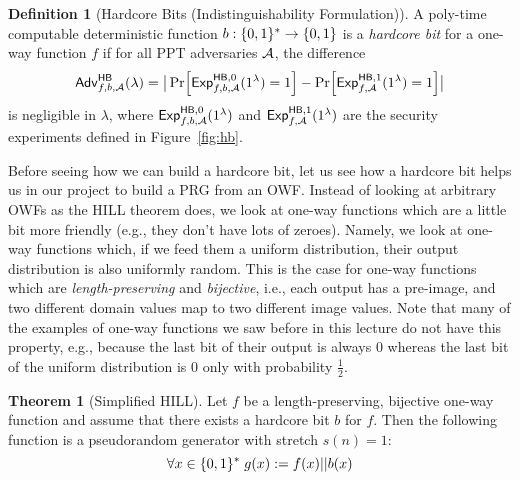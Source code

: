 \documentclass[a4paper,table,dvipsnames]{article}
\theoremstyle{definition}
\newtheorem{definition}{Definition}[section]
\newtheorem*{theorem}{Theorem}
\begin{document}
\begin{definition}[Hardcore Bits (Indistinguishability Formulation)]\label{def:hcb-ind}
A poly-time computable deterministic function $b:\{0,1\}^*\rightarrow\{0,1\}$ is a \emph{hardcore bit} for a one-way function $f$ if
for all PPT adversaries $\mathcal{A}$, the difference
\[ \mathsf{Adv}^{\mathsf{HB}}_{f,b,\adv}(\lambda)=\big|\prob{{\mathsf{Exp}}_{f,b,\adv}^{\mathsf{HB},0}(1^\lambda) = 1} 
   - \prob{{\mathsf{Exp}}_{f,\adv}^{\mathsf{HB},1}(1^\lambda) = 1}\big| \]
is negligible in $\lambda$, where ${\mathsf{Exp}}_{f,b,\mathcal{A}}^{\mathsf{HB},0}(1^\lambda)$ and ${\mathsf{Exp}}_{f,\mathcal{A}}^{\mathsf{HB},1}(1^\lambda)$ are the security experiments defined in Figure~\ref{fig:hb}.
\end{definition}

Before seeing how we can build a hardcore bit, let us see how a hardcore bit helps us in our project to build a PRG from an OWF.
Instead of looking at arbitrary OWFs as the HILL theorem does, we look at one-way functions which are a little bit more friendly
(e.g., they don't have lots of zeroes). Namely, we look at one-way functions which, if we feed them a uniform distribution, their
output distribution is also uniformly random. This is the case for one-way functions which are \emph{length-preserving} and
\emph{bijective}, i.e., each output has a pre-image, and two different domain values map to two different image values.
Note that many of the examples of one-way functions we saw before in this lecture do not have this property, e.g., because the last bit of their output is always $0$ whereas the last bit of the uniform distribution is $0$ only with probability $\tfrac{1}{2}$.
\begin{theorem}[Simplified HILL]\label{thm:weakHill}
Let $f$ be a length-preserving, bijective one-way function and assume that there exists a hardcore bit $b$ for $f$. Then the following function is a pseudorandom generator with stretch $s(n)=1$:
\[\forall x\in\{0,1\}^*\;g(x):=f(x)||b(x)\]
\end{theorem}
\end{document}
